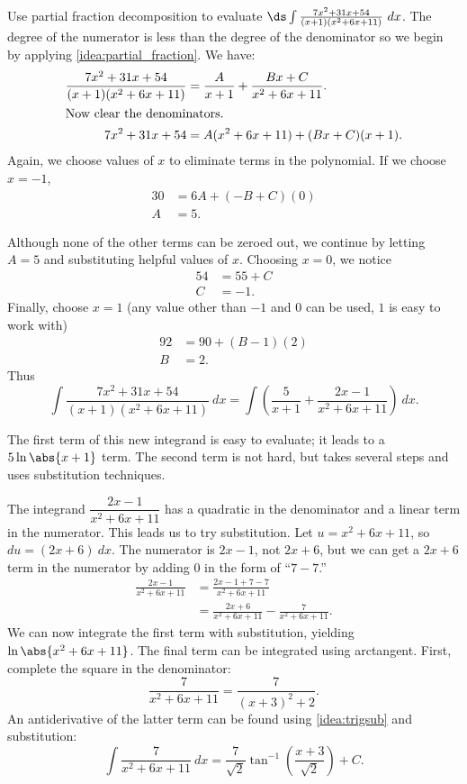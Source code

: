 \begin{example}\label{ex_pf5}
Use partial fraction decomposition to evaluate $\ds \int\frac{7x^2+31x+54}{(x+1)(x^2+6x+11)}\ dx$.
\solution
The degree of the numerator is less than the degree of the denominator so we begin by applying \autoref{idea:partial_fraction}. We have:
\begin{align*}
\frac{7x^2+31x+54}{(x+1)(x^2+6x+11)} &= \frac{A}{x+1} + \frac{Bx+C}{x^2+6x+11}. \\
\intertext{Now clear the denominators.}
7x^2+31x+54 &= A(x^2+6x+11) + (Bx+C)(x+1).
\end{align*}
Again, we choose values of $x$ to eliminate terms in the polynomial.  If we choose $x=-1$,
\begin{align*}
 30&=6A + (-B+C)(0)\\
 A&= 5.
\end{align*}

Although none of the other terms can be zeroed out, we continue by letting $A=5$ and substituting helpful values of $x$. 
Choosing $x=0$, we notice
\begin{align*}
 54&= 55 +C \\
 C&= -1.
\end{align*}
Finally, choose $x=1$ (any value other than $-1$ and $0$ can be used, $1$ is easy to work with)
\begin{align*}
 92&=90 + (B-1)(2)\\
 B&= 2.
\end{align*}
Thus
\[
 \int\frac{7x^2+31x+54}{(x+1)(x^2+6x+11)}\ dx
 = \int\left(\frac{5}{x+1} + \frac{2x-1}{x^2+6x+11}\right)\ dx.
\]

The first term of this new integrand is easy to evaluate; it leads to a $5\ln\abs{x+1}$ term. The second term is not hard, but takes several steps and uses substitution techniques.

The integrand $\dfrac{2x-1}{x^2+6x+11}$ has a quadratic in the denominator and a linear term in the numerator. This leads us to try substitution. Let $u=x^2+6x+11$, so $du=(2x+6)\ dx$. The numerator is $2x-1$, not $2x+6$, but we can get a $2x+6$ term in the numerator by adding 0 in the form of ``$7-7$.''
\begin{align*}
	\frac{2x-1}{x^2+6x+11} &= \frac{2x-1+7-7}{x^2+6x+11} \\
	&= \frac{2x+6}{x^2+6x+11} - \frac{7}{x^2+6x+11}.
\end{align*}
We can now integrate the first term with substitution, yielding $\ln\abs{x^2+6x+11}$. The final term can be integrated using arctangent. First, complete the square in the denominator:
\[\frac{7}{x^2+6x+11} = \frac{7}{(x+3)^2+2}.\]
An antiderivative of the latter term can be found using \autoref{idea:trigsub} and substitution:
\[
 \int \frac7{x^2+6x+11}\ dx=\frac7{\sqrt2}\tan^{-1}\left(\frac{x+3}{\sqrt2}\right)+C.
\]


\end{example}
